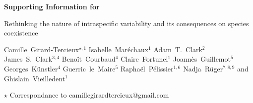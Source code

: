 
\begin{center}
  \Large{\textbf{Supporting Information for}}
\end{center}

\vspace{1cm}

\begin{center}
  \LARGE{Rethinking the nature of intraspecific variability and its consequences on species coexistence}
\end{center}

\vspace{1cm}

\begin{center}
  \large{
  Camille~Girard-Tercieux$^{\star, 1}$ \hspace{0.5cm} Isabelle~Maréchaux$^{1}$ \hspace{0.5cm} Adam~T.~Clark$^2$ \hspace{0.5cm} James~S.~Clark$^{3,4}$ \hspace{0.5cm} Benoît~Courbaud$^{4}$ \hspace{0.5cm} Claire~Fortunel$^{1}$ \hspace{0.5cm} Joannès~Guillemot$^{5}$ \hspace{0.5cm} Georges~Künstler$^{4}$ \hspace{0.5cm} Guerric~le~Maire$^{5}$ \hspace{0.5cm} Raphaël~Pélissier$^{1, 6}$ \hspace{0.5cm} Nadja~Rüger$^{7, 8, 9}$ \hspace{0.5cm} and Ghislain~Vieilledent$^{1}$
  }
\end{center}

\vspace{0.5cm}

\begin{center}
  $\star$ Correspondance to camillegirardtercieux@gmail.com\\
\end{center}

\vspace{0.5cm}

